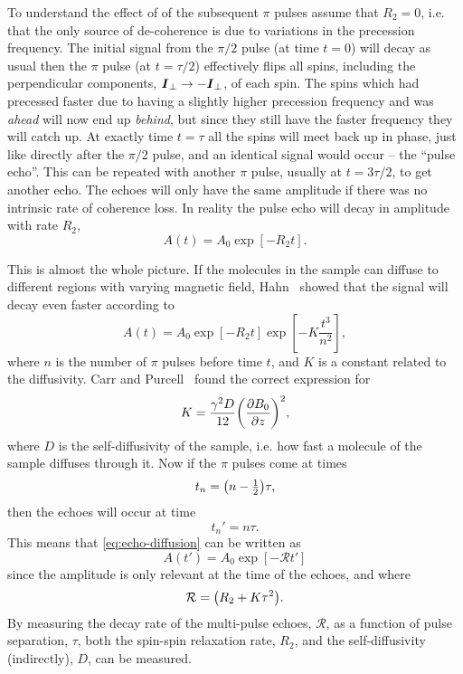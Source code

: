 \documentclass[11pt,a4paper, twocolumn,
swedish, english %
]{article}
\begin{document}
To understand the effect of of the subsequent $\pi$ pulses assume that
$R_2=0$, i.e. that the only source of de-coherence is due to
variations in the precession frequency. The initial signal from the
$\pi/2$ pulse (at time $t=0$) will decay as usual then the $\pi$ pulse
(at $t=\tau/2$) effectively flips all spins, including the
perpendicular components, $\vb*I_\perp\to-\vb*I_\perp$, of each
spin. The spins which had precessed faster due to having a slightly
higher precession frequency and was \emph{ahead} will now end up
\emph{behind}, but since they still have the faster frequency they
will catch up. At exactly time $t=\tau$ all the spins will meet
back up in phase, just like directly after the $\pi/2$ pulse, and an
identical signal would occur -- the ``pulse echo''. This can be
repeated with another $\pi$ pulse, usually at $t=3\tau/2$, to get
another echo. The echoes will only have the same amplitude if there
was no intrinsic rate of coherence loss. In reality the pulse echo
will decay in amplitude with rate $R_2$,
\begin{equation}
A(t)=A_0\exp[-R_2t].
\end{equation}

This is almost the whole picture. If the molecules in the sample can
diffuse to different regions with varying magnetic field,
Hahn~\cite{Hahn1950} showed that the signal will decay even faster
according to
\begin{equation}\label{eq:echo-diffusion}
A(t)=A_0\exp[-R_2t]
\exp[-K\frac{t^3}{n^2}],
\end{equation}
where $n$ is the number of $\pi$ pulses before time $t$, and $K$ is a
constant related to the diffusivity. Carr and
Purcell~\cite{Carr-Purcell1954} found the correct expression for
\begin{equation}
K=\frac{\gamma^2D}{12}\qty(\pdv{B_0}{z})^2,
\end{equation}
where $D$ is the self-diffusivity of the sample, i.e. how fast a
molecule of the sample diffuses through it. Now if the $\pi$ pulses
come at times
\begin{equation}
t_{n}=\qty(n-\tfrac{1}{2})\tau,
\end{equation}
then the echoes will occur at
time 
\begin{equation}
t_n'=n\tau.
\end{equation}
This means that \eqref{eq:echo-diffusion} can be written as
\begin{equation}
A(t')=A_0\exp[-\mathcal{R}t']
\end{equation}
since the amplitude is only relevant at the time of the echoes, and
where 
\begin{equation}
\mathcal{R}=\qty(R_2+K\tau^2).
\end{equation}
By measuring the decay rate of the multi-pulse echoes, $\mathcal{R}$,
as a function of pulse separation, $\tau$, both the spin-spin relaxation
rate, $R_2$, and the self-diffusivity (indirectly), $D$, can be measured.
\end{document}
